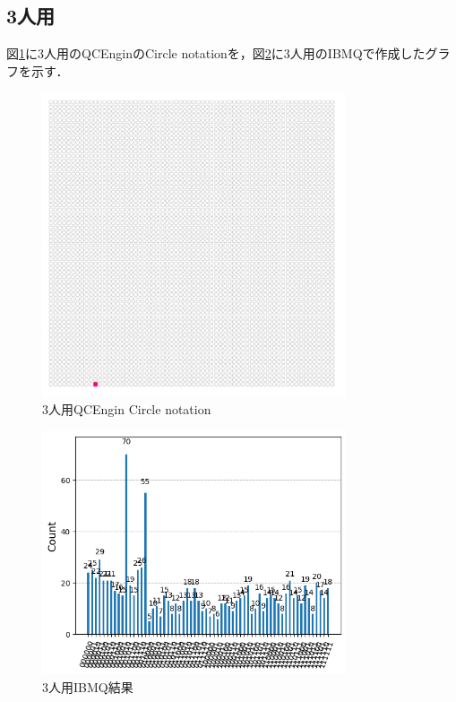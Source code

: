 \documentclass[titlepage,a4paper]{jsarticle}
\begin{document}
\subsection{3人用}
図\ref{3:circle}に3人用のQCEnginのCircle notationを，図\ref{3:ibmq}に3人用のIBMQで作成したグラフを示す．
\begin{figure}[H]
  \centering
  \includegraphics[width=0.8\textwidth]{img/3_circle.png}
  \caption{3人用QCEngin Circle notation}
  \label{3:circle}
\end{figure}
\begin{figure}[H]
  \centering
  \includegraphics[width=0.8\textwidth]{img/3_kairyou_python.png}
  \caption{3人用IBMQ結果}
  \label{3:ibmq}
\end{figure}
\end{document}
